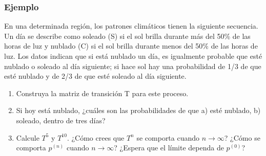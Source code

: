\documentclass[spanish]{beamer}
\begin{document}

\begin{frame}
\frametitle{Ejemplo}
En una determinada región, los patrones climáticos tienen la siguiente secuencia. Un día se describe como soleado (S) si el sol brilla durante más del 50\% de las horas de luz y nublado (C) si el sol brilla durante menos del 50\% de las horas de luz. Los datos indican que si está nublado un día, es igualmente probable que esté nublado o soleado al día siguiente; si hace sol hay una probabilidad de 1/3 de que esté nublado y de 2/3 de que esté soleado al día siguiente.

\begin{enumerate}
\item Construya la matriz de transición T para este proceso.
\item Si hoy está nublado, ¿cuáles son las probabilidades de que a) esté nublado, b) soleado, dentro de tres días?
\item Calcule $T^5$ y $T^{10}$. ¿Cómo crees que $T^n$ se comporta cuando $n \rightarrow  \infty$? ¿Cómo se comporta $p^{(n)}$ cuando $n \rightarrow  \infty$? ¿Espera que el límite dependa de $p^{(0)}$?
\end{enumerate}
\end{frame}



\end{document}
